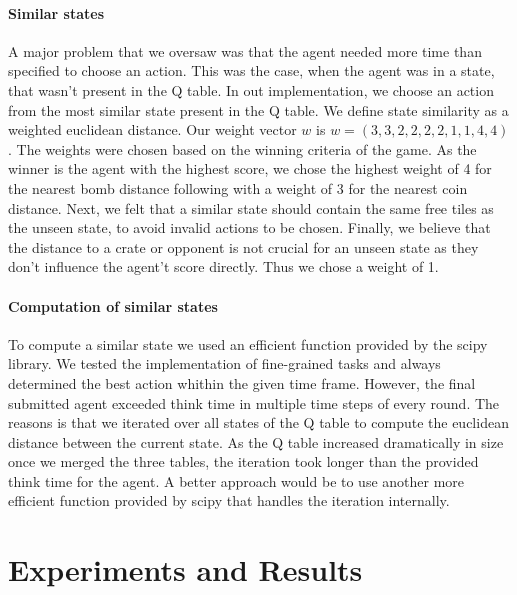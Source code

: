 \documentclass[
	letterpaper, %
	10pt, %
]{CSUniSchoolLabReport}
\begin{document}
\paragraph*{Similar states}
A major problem that we oversaw was that the agent needed more time than specified to choose an action.
This was the case, when the agent was in a state, that wasn't present in the Q table. In out implementation, we
choose an action from the most similar state present in the Q table. We define state similarity as a weighted euclidean
distance. Our weight vector $w$ is $ w= (3, 3, 2, 2, 2, 2, 1, 1, 4, 4)$. The weights were
chosen based on the winning criteria of the game. As the winner is the agent with the highest score,
we chose the highest weight of 4 for the nearest bomb distance following with a weight of 3 for the nearest coin distance.
Next, we felt that a similar state should contain the same free tiles as the unseen state, to avoid invalid actions to be chosen.
Finally, we believe that the distance to a crate or opponent is not crucial for an unseen state as they don't influence the agent't score directly.
Thus we chose a weight of 1.

\paragraph*{Computation of similar states}
To compute a similar state we used an efficient function provided by the scipy library. We
tested the implementation of fine-grained tasks and always determined the best action
whithin the given time frame. However, the final submitted agent exceeded think time in multiple time steps of every round.
The reasons is that we iterated over all states of the Q table to compute the euclidean distance between
the current state. As the Q table increased dramatically in size once we merged the three tables, the iteration took longer than the provided
think time for the agent. A better approach would be to use another more efficient function provided by scipy
that handles the iteration internally.





\section{Experiments and Results}
\end{document}
